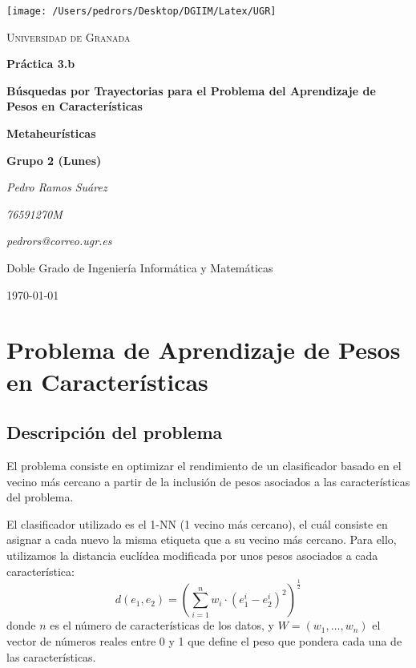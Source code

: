 \documentclass[11pt,a4paper]{article}
\begin{document}
\begin{titlepage}
\centering
\texttt{[image: /Users/pedrors/Desktop/DGIIM/Latex/UGR]}\par\vspace{1cm}
{\scshape\LARGE Universidad de Granada \par}
\vspace{1cm}
{\Huge\bfseries Práctica 3.b\par}
{\Large\bfseries Búsquedas por Trayectorias para el Problema del Aprendizaje de Pesos en Características
\par}
\vspace{1.5cm}
{\huge\bfseries Metaheurísticas\par}
{\large\bfseries Grupo 2 (Lunes)\par}
\vspace{2cm}
{\Large\itshape Pedro Ramos Suárez\par}
{\large\itshape 76591270M\par}
{\large\itshape pedrors@correo.ugr.es\par}
\vfill
Doble Grado de Ingeniería Informática y Matemáticas
\vfill
{\large \today \par}
\author{A}
\end{titlepage}

\tableofcontents
\newpage
\section{Problema de Aprendizaje de Pesos en Características}

\subsection{Descripción del problema}

El problema consiste en optimizar el rendimiento de un clasificador basado en el vecino más cercano a partir de la inclusión de pesos asociados a las características del problema.

El clasificador utilizado es el 1-NN (1 vecino más cercano), el cuál consiste en asignar a cada nuevo la misma etiqueta que a su vecino más cercano. Para ello, utilizamos la distancia euclídea modificada por unos pesos asociados a cada característica:
$$d(e_{1}, e_{2}) = (\sum_{i=1}^{n} w_{i} \cdot (e_{1}^{i} - e_{2}^{i})^{2})^{\frac{1}{2}}$$
donde $n$ es el número de características de los datos, y $W = (w_{1}, \dots, w_{n})$ el vector de números reales entre 0 y 1 que define el peso que pondera cada una de las características.
\end{document}
